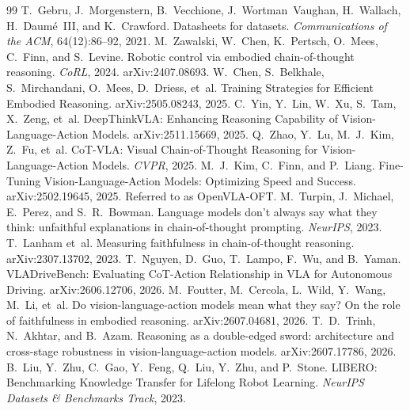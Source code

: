 \begin{thebibliography}{99}
 T.~Gebru, J.~Morgenstern, B.~Vecchione, J.~Wortman~Vaughan, H.~Wallach, H.~Daum\'e~III, and K.~Crawford. Datasheets for datasets. \emph{Communications of the ACM}, 64(12):86--92, 2021.
 M.~Zawalski, W.~Chen, K.~Pertsch, O.~Mees, C.~Finn, and S.~Levine. Robotic control via embodied chain-of-thought reasoning. \emph{CoRL}, 2024. arXiv:2407.08693.
 W.~Chen, S.~Belkhale, S.~Mirchandani, O.~Mees, D.~Driess, et~al. Training Strategies for Efficient Embodied Reasoning. arXiv:2505.08243, 2025.
 C.~Yin, Y.~Lin, W.~Xu, S.~Tam, X.~Zeng, et~al. DeepThinkVLA: Enhancing Reasoning Capability of Vision-Language-Action Models. arXiv:2511.15669, 2025.
 Q.~Zhao, Y.~Lu, M.~J.~Kim, Z.~Fu, et~al. {CoT-VLA}: Visual Chain-of-Thought Reasoning for Vision-Language-Action Models. \emph{CVPR}, 2025.
 M.~J.~Kim, C.~Finn, and P.~Liang. Fine-Tuning Vision-Language-Action Models: Optimizing Speed and Success. arXiv:2502.19645, 2025. Referred to as OpenVLA-OFT.
 M.~Turpin, J.~Michael, E.~Perez, and S.~R.~Bowman. Language models don't always say what they think: unfaithful explanations in chain-of-thought prompting. \emph{NeurIPS}, 2023.
 T.~Lanham et~al. Measuring faithfulness in chain-of-thought reasoning. arXiv:2307.13702, 2023.
 T.~Nguyen, D.~Guo, T.~Lampo, F.~Wu, and B.~Yaman. {VLADriveBench}: Evaluating CoT-Action Relationship in VLA for Autonomous Driving. arXiv:2606.12706, 2026.
 M.~Foutter, M.~Cercola, L.~Wild, Y.~Wang, M.~Li, et~al. Do vision-language-action models mean what they say? On the role of faithfulness in embodied reasoning. arXiv:2607.04681, 2026.
 T.~D.~Trinh, N.~Akhtar, and B.~Azam. Reasoning as a double-edged sword: architecture and cross-stage robustness in vision-language-action models. arXiv:2607.17786, 2026.
 B.~Liu, Y.~Zhu, C.~Gao, Y.~Feng, Q.~Liu, Y.~Zhu, and P.~Stone. {LIBERO}: Benchmarking Knowledge Transfer for Lifelong Robot Learning. \emph{NeurIPS Datasets \& Benchmarks Track}, 2023.

\end{thebibliography}

